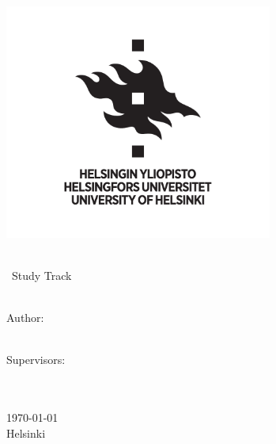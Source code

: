 \documentclass[12pt, a4paper, oneside]{article}
\begin{document}


\begin{titlepage}
    \includegraphics[width=8.8cm]{figures/hy_pysty}
    \vspace{1cm}
    \centering

    {\Large \thesistitle \par}
    \vfill

    \raggedleft
    {
        \normalsize \degreeprogramme \\
        \studytrack~Study Track \\
        \thesislevel \\ \vspace{1.3cm}

        Author: \\
        \thesisauthor \\ \vspace{1.3cm}

        Supervisors: \\
        \supervisor \\
        \advisor \\ \vspace{1.3cm}

        \today \\
        Helsinki \par
    }
\end{titlepage}
\end{document}
